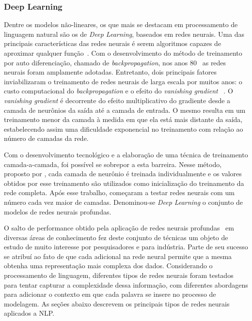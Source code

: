 \subsubsection{Deep Learning}

Dentre os modelos não-lineares, os que mais se destacam em processamento de
linguagem natural são os de \textit{Deep Learning}, baseados em redes neurais.
Uma das principais características das redes neurais é serem algoritmos
capazes de aproximar qualquer função~\cite{hornik89}.
Com o desenvolvimento do método de treinamento por auto diferenciação, chamado
de \textit{backpropagation}, nos anos 80~\cite{werbos82} as redes neurais
foram amplamente adotadas.
Entretanto, dois principais fatores inviabilizaram o treinamento de redes
neurais de larga escala por muitos anos: o custo computacional do
\textit{backpropagation} e o efeito do \textit{vanishing gradient}~
\cite{hochreiter98}.
O \textit{vanishing gradient} é decorrente do efeito multiplicativo do
gradiente desde a camada de neurônios da saída até a camada de entrada.
O mesmo resulta em um treinamento menor da camada à medida em que ela está
mais distante da saída, estabelecendo assim uma dificuldade exponencial no
treinamento com relação ao número de camadas da rede.

Com o desenvolvimento tecnológico e a elaboração de uma técnica de treinamento
camada-a-camada, foi possível se sobrepor a esta barreira.
Nesse método, proposto por \citet{hinton06}, cada camada de neurônio
é treinada individualmente e os valores obtidos por esse treinamento são
utilizados como inicialização do treinamento da rede completa.
Após esse trabalho, começaram a testar redes neurais com um número cada vez
maior de camadas.
Denominou-se \textit{Deep Learning} o conjunto de modelos de redes neurais
profundas.

O salto de performance obtido pela aplicação de redes neurais
profundas~\cite{lecun15} em diversas áreas de conhecimento fez deste conjunto de
técnicas um objeto de estudo de muito interesse por pesquisadores e para indústria.
Parte de seu sucesso se atribuí ao fato de que cada adicional na rede neural
permite que a mesma obtenha uma representação mais complexa dos dados.
Considerando o processamento de linguagem, diferentes tipos de redes neurais
foram testados para tentar capturar a complexidade dessa informação,
com diferentes abordagens para adicionar o contexto em que cada palavra se
insere no processo de modelagem.
As seções abaixo descrevem os principais tipos de redes neurais aplicados a NLP.

